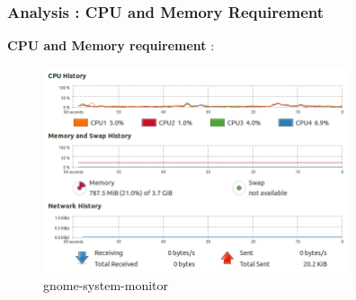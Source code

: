 \documentclass{beamer}
\begin{document}
\begin{frame}
\frametitle{Analysis : CPU and Memory Requirement}\textbf{CPU and Memory requirement} : 

\begin{figure}[h!]
\center
\includegraphics[width = 9cm]{gnome1}
\caption{gnome-system-monitor}
\end{figure}

\end{frame}
\end{document}
